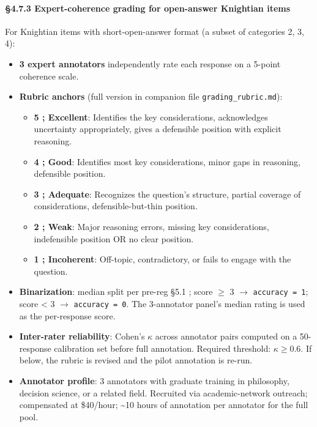 \documentclass{article}
\providecommand{\tightlist}{\setlength{\itemsep}{0pt}\setlength{\parskip}{0pt}}
\begin{document}
\paragraph{\S{}4.7.3 Expert-coherence grading for open-answer Knightian
items}\label{expert-coherence-grading-for-open-answer-knightian-items}

For Knightian items with short-open-answer format (a subset of
categories 2, 3, 4):

\begin{itemize}
\tightlist
\item
  \textbf{3 expert annotators} independently rate each response on a
  5-point coherence scale.
\item
  \textbf{Rubric anchors} (full version in companion file
  \texttt{grading\_rubric.md}):

  \begin{itemize}
  \tightlist
  \item
    \textbf{5 ; Excellent}: Identifies the key considerations,
    acknowledges uncertainty appropriately, gives a defensible position
    with explicit reasoning.
  \item
    \textbf{4 ; Good}: Identifies most key considerations, minor gaps in
    reasoning, defensible position.
  \item
    \textbf{3 ; Adequate}: Recognizes the question's structure, partial
    coverage of considerations, defensible-but-thin position.
  \item
    \textbf{2 ; Weak}: Major reasoning errors, missing key
    considerations, indefensible position OR no clear position.
  \item
    \textbf{1 ; Incoherent}: Off-topic, contradictory, or fails to
    engage with the question.
  \end{itemize}
\item
  \textbf{Binarization}: median split per pre-reg \S{}5.1 ; score \ensuremath{\geq} 3 \ensuremath{\rightarrow}
  \texttt{accuracy\ =\ 1}; score \textless{} 3 \ensuremath{\rightarrow}
  \texttt{accuracy\ =\ 0}. The 3-annotator panel's median rating is used
  as the per-response score.
\item
  \textbf{Inter-rater reliability}: Cohen's \(\kappa\) across annotator
  pairs computed on a 50-response calibration set before full
  annotation. Required threshold: \(\kappa \geq 0.6\). If below, the
  rubric is revised and the pilot annotation is re-run.
\item
  \textbf{Annotator profile}: 3 annotators with graduate training in
  philosophy, decision science, or a related field. Recruited via
  academic-network outreach; compensated at \$40/hour; \textasciitilde10
  hours of annotation per annotator for the full pool.
\end{itemize}
\end{document}
